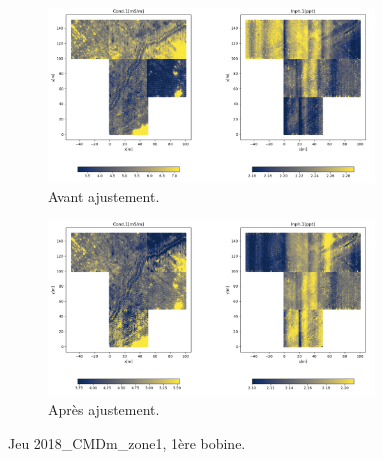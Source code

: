 \documentclass[12pt]{article}
\begin{document}
    \begin{figure}[ht!]
        \centering
        \begin{subfigure}[b]{\textwidth}
            \centering
            \includegraphics[width=0.95\textwidth]{Images/Frontiere_ex_1.png}
            \caption[]%
            {{ \small Avant ajustement.}}    
        \end{subfigure}
        \centering
        \begin{subfigure}[b]{\textwidth}  
            \centering 
            \includegraphics[width=0.95\textwidth]{Images/Frontiere_ex_1_aj.png}
            \caption[]%
            {{\small Après ajustement.}}    
        \end{subfigure}
        \caption{Jeu 2018\_CMDm\_zone1, 1ère bobine.}
    \end{figure}
\newpage
\end{document}
